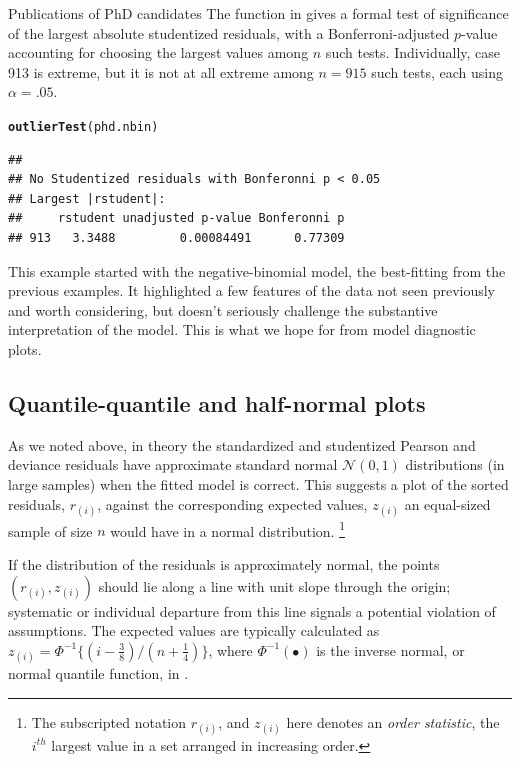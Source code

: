 \documentclass[11pt]{book}\usepackage[]{graphicx}\usepackage[]{color}
\makeatletter
\newcommand{\hlstd}[1]{\textcolor[rgb]{0.345,0.345,0.345}{#1}}%
\newcommand{\hlkwd}[1]{\textcolor[rgb]{0.737,0.353,0.396}{\textbf{#1}}}%
\newenvironment{kframe}{%
 \def\at@end@of@kframe{}%
 \ifinner\ifhmode%
  \def\at@end@of@kframe{\end{minipage}}%
  \begin{minipage}{\columnwidth}%
 \fi\fi%
 \def\FrameCommand##1{\hskip\@totalleftmargin \hskip-\fboxsep
 \colorbox{shadecolor}{##1}\hskip-\fboxsep
     \hskip-\linewidth \hskip-\@totalleftmargin \hskip\columnwidth}%
 \MakeFramed {\advance\hsize-\width
   \@totalleftmargin\z@ \linewidth\hsize
   \@setminipage}}%
 {\par\unskip\endMakeFramed%
 \at@end@of@kframe}
\newenvironment{knitrout}{}{} %
\renewenvironment{knitrout}{\small\renewcommand{\baselinestretch}{.85}}{} %
\makeatother
\begin{document}
\begin{Example}[phdpubs5]{Publications of PhD candidates}
The  function in  gives a formal test of significance of the largest absolute
studentized residuals, with a Bonferroni-adjusted $p$-value accounting for choosing the largest values
among $n$ such tests. Individually, case 913 is extreme, but it is not at all extreme among
$n=915$ such tests, each using $\alpha=.05$.

\begin{knitrout}
\color{fgcolor}\begin{kframe}
\begin{alltt}
\hlkwd{outlierTest}\hlstd{(phd.nbin)}
\end{alltt}
\begin{verbatim}
## 
## No Studentized residuals with Bonferonni p < 0.05
## Largest |rstudent|:
##     rstudent unadjusted p-value Bonferonni p
## 913   3.3488         0.00084491      0.77309
\end{verbatim}
\end{kframe}
\end{knitrout}
This example started with the negative-binomial model, the best-fitting from the previous examples.  It highlighted a
few features of the data not seen previously and worth considering, but doesn't seriously challenge the
substantive interpretation of the model.  This is what we hope for from model diagnostic plots.

\end{Example}

\subsection{Quantile-quantile and half-normal plots}

As we noted above, in theory
the standardized and studentized Pearson and deviance residuals have approximate
standard normal $\mathcal{N} (0,1)$
distributions (in large samples)
when the fitted model is correct.
This suggests a plot of the sorted residuals, $r_{(i)}$, against the
corresponding expected values,  $z_{(i)}$
an equal-sized sample of size $n$ would have in a
normal distribution.%
\footnote{
The subscripted notation $r_{(i)}$, and $z_{(i)}$ here denotes an \emph{order statistic}, the
$i^{th}$ largest value in a set arranged in increasing order.
}

If the distribution of the residuals is approximately
normal, the points $(r_{(i)}, z_{(i)})$ should lie along a line with unit slope through the origin;
systematic or individual departure from this line signals a potential violation of assumptions.
The expected values are typically calculated as
$z_{(i)} = \Phi^{-1} \{ (i-\frac{3}{8}) / ( n + \frac{1}{4}) \}$,
where $\Phi^{-1} (\bullet)$ is the inverse normal, or normal quantile function,  in \R.
\end{document}
